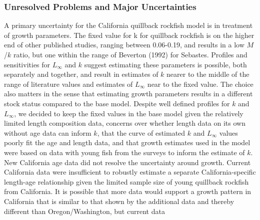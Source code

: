 \documentclass[11pt,
  english,
  a4paper,
]{article}
\begin{document}
\hypertarget{unresolved-problems-and-major-uncertainties}{%
\subsubsection{Unresolved Problems and Major Uncertainties}\label{unresolved-problems-and-major-uncertainties}}

\leavevmode\tagmcend\tagstructend


A primary uncertainty for the California quillback rockfish model is in treatment of growth parameters. The fixed value for k for quillback rockfish is on the higher end of other published studies, ranging between 0.06-0.19, and results in a low {\(M\)\leavevmode\tagmcend\tagstructend}/{\(k\)\leavevmode\tagmcend\tagstructend} ratio, but one within the range of Beverton {(1992)\leavevmode\tagmcend\tagstructend} for Sebastes. Profiles and sensitivities for {\(L_{\infty}\)\leavevmode\tagmcend\tagstructend} and {\(k\)\leavevmode\tagmcend\tagstructend} suggest estimating these parameters is possible, both separately and together, and result in estimates of {\(k\)\leavevmode\tagmcend\tagstructend} nearer to the middle of the range of literature values and estimates of {\(L_{\infty}\)\leavevmode\tagmcend\tagstructend} near to the fixed value. The choice also matters in the sense that estimating growth parameters results in a different stock status compared to the base model. Despite well defined profiles for {\(k\)\leavevmode\tagmcend\tagstructend} and {\(L_{\infty}\)\leavevmode\tagmcend\tagstructend}, we decided to keep the fixed values in the base model given the relatively limited length composition data, concerns over whether length data on its own without age data can inform {\(k\)\leavevmode\tagmcend\tagstructend}, that the curve of estimated {\(k\)\leavevmode\tagmcend\tagstructend} and {\(L_{\infty}\)\leavevmode\tagmcend\tagstructend} values poorly fit the age and length data, and that growth estimates used in the model were based on data with young fish from the surveys to inform the estimate of {\(k\)\leavevmode\tagmcend\tagstructend}. New California age data did not resolve the uncertainty around growth. Current California data were insufficient to robustly estimate a separate California-specific length-age relationship given the limited sample size of young quillback rockfish from California. It is possible that more data would support a growth pattern in California that is similar to that shown by the additional data and thereby different than Oregon/Washington, but current data 
\end{document}
